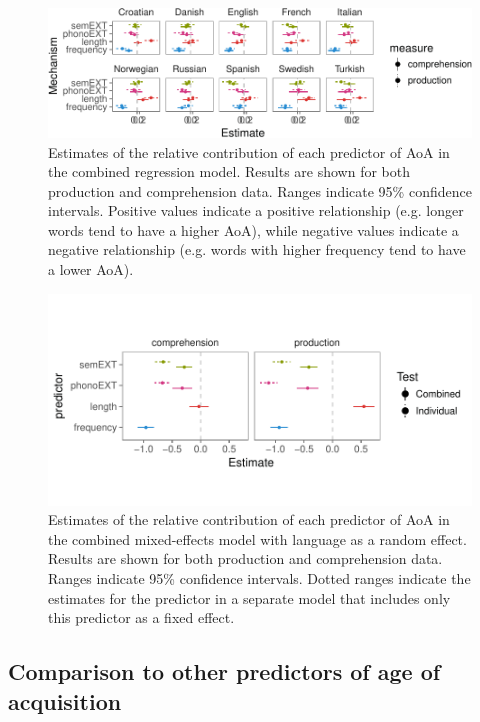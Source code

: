 \documentclass[english,floatsintext,man]{apa6}
\theoremstyle{definition}
\theoremstyle{definition}
\theoremstyle{definition}
\theoremstyle{remark}
\begin{document}
\begin{figure}[!h]
\includegraphics[width=\textwidth]{ms_files/figure-latex/staticPred-1} \caption{Estimates of the relative contribution of each predictor of AoA in the combined regression model. Results are shown for both production and comprehension data. Ranges indicate 95\% confidence intervals. Positive values indicate a positive relationship (e.g. longer words tend to have a higher AoA), while negative values indicate a negative relationship (e.g. words with higher frequency tend to have a lower AoA).}\label{fig:staticPred}
\end{figure}

\begin{figure}[!h]
\includegraphics[width=\textwidth]{figs/plot_static_preds_all} \caption{Estimates of the relative contribution of each predictor of AoA in the combined mixed-effects model with language as a random effect. Results are shown for both production and comprehension data. Ranges indicate 95\% confidence intervals. Dotted ranges indicate the estimates for the predictor in a separate model that includes only this predictor as a fixed effect.}\label{fig:staticAll}
\end{figure}

\subsection{Comparison to other predictors of age of
acquisition}\label{comparison-to-other-predictors-of-age-of-acquisition}
\end{document}

